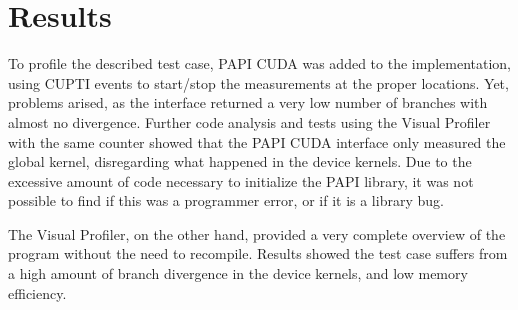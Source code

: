 \section{Results}
\label{sec:results}


To profile the described test case, PAPI CUDA was added to the implementation, using CUPTI events to start/stop the measurements at the proper locations. Yet, problems arised, as the interface returned a very low number of branches with almost no divergence. Further code analysis and tests using the Visual Profiler with the same counter showed that the PAPI CUDA interface only measured the global kernel, disregarding what happened in the device kernels. Due to the excessive amount of code necessary to initialize the PAPI library, it was not possible to find if this was a programmer error, or if it is a library bug.

The Visual Profiler, on the other hand, provided a very complete overview of the program without the need to recompile. Results showed the test case suffers from a high amount of branch divergence in the device kernels, and low memory efficiency.

